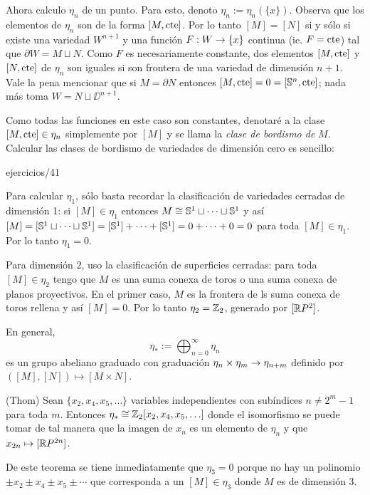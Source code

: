 \documentclass[../../topologia_algebraica]{subfiles}
\begin{document}
Ahora calculo $\eta_n$ de un punto. Para esto, denoto $\eta_n:=\eta_n(\{x\})$. Observa que los
elementos de $\eta_n$ son de la forma $[M,\text{cte}]$. Por lo tanto $[M]=[N]$ si y s\'olo si existe
una variedad $W^{n+1}$ y una funci\'on $F:W\rightarrow\{x\}$ continua (ie. $F=\text{cte}$) tal que
$\partial W= M \sqcup N$. Como $F$ es necesariamente constante, dos elementos $[M,\text{cte}]$ y $[N,\text{cte}]$
de $\eta_n$ son iguales si son frontera de una variedad de dimensi\'on $n+1$. Vale la pena mencionar
que si $M=\partial N$ entonces $[M,\text{cte}]=0=[\mathbb{S}^n,\text{cte}]$; nada m\'as toma $W=N\sqcup\DD^{n+1}$.


Como todas las funciones en este caso son constantes, denotar\'e a la clase $[M,\text{cte}]\in\eta_n$
simplemente por $[M]$ y se llama la \emph{clase de bordismo de} $M$. Calcular las clases de
bordismo de variedades de dimensi\'on cero es sencillo:

{ejercicios/41} %

Para calcular $\eta_1$, s\'olo basta recordar la clasificaci\'on de variedades cerradas de
dimensi\'on 1: si $[M]\in\eta_1$ entonces $M\cong\mathbb{S}^1\sqcup\cdots\sqcup\mathbb{S}^1$ y as\'i
$[M]=[\mathbb{S}^1\sqcup\cdots\sqcup\mathbb{S}^1]=[\mathbb{S}^1]+\cdots+[\mathbb{S}^1]=0+\cdots+0=0$ para toda $[M]\in\eta_1$.
Por lo tanto $\eta_1=0$.

Para dimensi\'on $2$, uso la clasificaci\'on de superficies cerradas: para toda $[M]\in\eta_2$
tengo que $M$ es una suma conexa de toros o una suma conexa de planos proyectivos. En el primer
caso, $M$ es la frontera de ls suma conexa de toros rellena y as\'i $[M]=0$. Por lo tanto
$\eta_2=\mathbb{Z}_2$, generado por $[\mathbb{R} P^2]$.

En general,
\[
  \eta_*:=\bigoplus_{n=0}^{\infty}\eta_n
\]
es un grupo abeliano graduado con graduaci\'on $\eta_n\times\eta_m\rightarrow\eta_{n+m}$ definido por
$([M],[N])\mapsto [M\times N]$.

\begin{thm}(Thom)
  Sean $\{x_2,x_4,x_5,\ldots\}$ variables independientes con sub\'indices $n\neq 2^m-1$ para toda $m$.
  Entonces $\eta_*\cong\mathbb{Z}_2[x_2,x_4,x_5,\ldots]$ donde el isomorfismo se puede tomar de tal manera
  que la imagen de $x_n$ es un elemento de $\eta_n$ y que $x_{2n}\mapsto[\mathbb{R} P^{2n}]$.
\end{thm}

De este teorema se tiene inmediatamente que $\eta_3=0$ porque no hay un polinomio
$\pm x_2\pm x_4\pm x_5\pm\cdots$ que corresponda a un $[M]\in\eta_3$ donde $M$ es de dimensi\'on 3.
\end{document}
